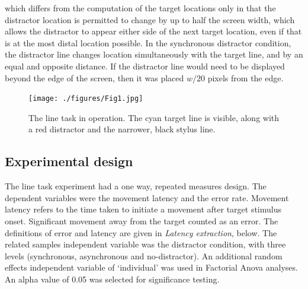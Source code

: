 \documentclass[10pt,letterpaper]{article}
\begin{document}
which differs from the computation of the target locations only in
that the distractor location is permitted to change by up to half the
screen width, which allows the distractor to appear either side of the
next target location, even if that is at the most distal location
possible.  In the synchronous distractor condition, the distractor
line changes location simultaneously with the target line, and by an
equal and opposite distance. If the distractor line would need to be
displayed beyond the edge of the screen, then it was placed $w/20$
pixels from the edge.

\begin{figure}[htb!]
\centering
\texttt{[image: ./figures/Fig1.jpg]}
\caption[The line task.]
{The line task in operation. The cyan
  target line is visible, along with a red distractor and the
  narrower, black stylus line.}
\label{linetask}
\end{figure}

\subsection*{Experimental design}
The line task experiment had a one way, repeated measures design. The
dependent variables were the movement latency and the error
rate. Movement latency refers to the time taken to initiate a movement
after target stimulus onset. Significant movement away from the target
counted as an error. The definitions of error and latency are given in
\emph{Latency extraction}, below. The related samples independent
variable was the distractor condition, with three levels (synchronous,
asynchronous and no-distractor). An additional random effects
independent variable of `individual' was used in Factorial Anova
analyses. An alpha value of 0.05 was selected for significance
testing. %
\end{document}
